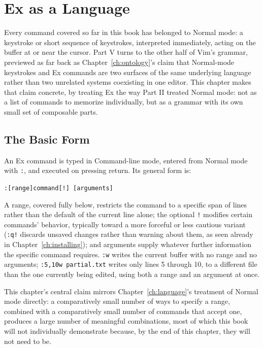 \chapter{Ex as a Language}
\label{ch:ex}

Every command covered so far in this book has belonged to Normal mode: a keystroke or short sequence of keystrokes, interpreted immediately, acting on the buffer at or near the cursor. Part V turns to the other half of Vim's grammar, previewed as far back as Chapter~\ref{ch:ontology}'s claim that Normal-mode keystrokes and Ex commands are two surfaces of the same underlying language rather than two unrelated systems coexisting in one editor. This chapter makes that claim concrete, by treating Ex the way Part II treated Normal mode: not as a list of commands to memorize individually, but as a grammar with its own small set of composable parts.

\section{The Basic Form}

An Ex command is typed in Command-line mode, entered from Normal mode with \texttt{:}, and executed on pressing return. Its general form is:

\begin{center}
\texttt{:[range]command[!] [arguments]}
\end{center}

A range, covered fully below, restricts the command to a specific span of lines rather than the default of the current line alone; the optional \texttt{!} modifies certain commands' behavior, typically toward a more forceful or less cautious variant (\texttt{:q!} discards unsaved changes rather than warning about them, as seen already in Chapter~\ref{ch:installing}); and arguments supply whatever further information the specific command requires. \texttt{:w} writes the current buffer with no range and no arguments; \texttt{:5,10w partial.txt} writes only lines 5 through 10, to a different file than the one currently being edited, using both a range and an argument at once.

This chapter's central claim mirrors Chapter~\ref{ch:language}'s treatment of Normal mode directly: a comparatively small number of ways to specify a range, combined with a comparatively small number of commands that accept one, produces a large number of meaningful combinations, most of which this book will not individually demonstrate because, by the end of this chapter, they will not need to be.

